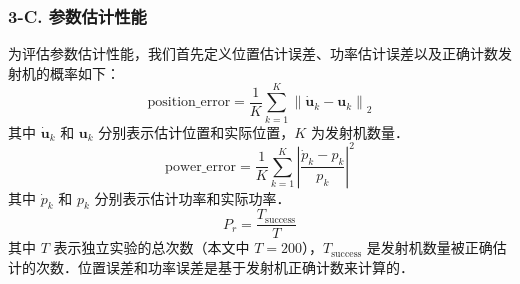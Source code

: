 \documentclass[a4paper,zihao=-4]{ctexart}
\renewcommand{\mathbf}[1]{\symbf{#1}}
\renewcommand{\boldsymbol}[1]{\symbfit{#1}}
\begin{document}



\subsubsection*{3-C. 参数估计性能}

为评估参数估计性能，我们首先定义位置估计误差、功率估计误差以及正确计数发射机的概率如下：
\begin{equation}
    \label{eq:position_error}
    \text{position\_error} = \frac{1}{K} \sum_{k=1}^{K} \left\| \dot{\mathbf{u}}_k - \mathbf{u}_k \right\|_2
\end{equation}
其中 $\dot{\mathbf{u}}_k$ 和 $\mathbf{u}_k$ 分别表示估计位置和实际位置，$K$ 为发射机数量．
\begin{equation}
    \label{eq:power_error}
    \text{power\_error} = \frac{1}{K} \sum_{k=1}^{K} \left| \frac{\dot{p}_k - p_k}{p_k} \right|^2
\end{equation}
其中 $\dot{p}_k$ 和 $p_k$ 分别表示估计功率和实际功率．
\begin{equation}
    \label{eq:success_probability}
    P_r = \frac{T_{\mathrm{success}}}{T}
\end{equation}
其中 $T$ 表示独立实验的总次数（本文中 $T=200$），$T_{\mathrm{success}}$ 是发射机数量被正确估计的次数．位置误差和功率误差是基于发射机正确计数来计算的．
\end{document}
